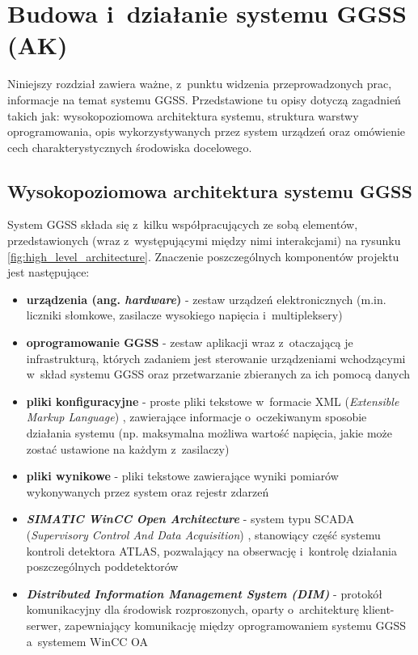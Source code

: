 \chapter{Budowa i~działanie systemu GGSS (AK)}
\label{cha:ggss}

\graphicspath{{3_ggss_introduction/static/}}

Niniejszy rozdział zawiera ważne, z~punktu widzenia przeprowadzonych prac, informacje na temat systemu GGSS. Przedstawione tu opisy dotyczą zagadnień takich jak: wysokopoziomowa architektura systemu, struktura warstwy oprogramowania, opis wykorzystywanych przez system urządzeń oraz omówienie cech charakterystycznych środowiska docelowego. 

\section{Wysokopoziomowa architektura systemu GGSS}
System GGSS składa się z~kilku współpracujących ze sobą elementów, przedstawionych (wraz z~występującymi między nimi interakcjami) na rysunku \ref{fig:high_level_architecture}. Znaczenie poszczególnych komponentów projektu jest następujące:
\begin{itemize}
    \item \textbf{urządzenia (ang. \emph{hardware})} - zestaw urządzeń elektronicznych (m.in. liczniki słomkowe, zasilacze wysokiego napięcia i~multipleksery)
    \item \textbf{oprogramowanie GGSS} - zestaw aplikacji wraz z~otaczającą je infrastrukturą, których zadaniem jest sterowanie urządzeniami wchodzącymi w~skład systemu GGSS oraz przetwarzanie zbieranych za ich pomocą danych
    \item \textbf{pliki konfiguracyjne} - proste pliki tekstowe w~formacie XML (\emph{Extensible Markup Language}) \cite{XML_wikipedia}, zawierające informacje o~oczekiwanym sposobie działania systemu (np. maksymalna możliwa wartość napięcia, jakie może zostać ustawione na każdym z~zasilaczy)
    \item \textbf{pliki wynikowe} - pliki tekstowe zawierające wyniki pomiarów wykonywanych przez system oraz rejestr zdarzeń 
    \item \emph{\textbf{SIMATIC WinCC Open Architecture}} \cite{winccoa} - system typu SCADA (\emph{Supervisory Control And Data Acquisition}) \cite{SCADA_wikipedia}, stanowiący część systemu kontroli detektora ATLAS, pozwalający na obserwację i~kontrolę działania poszczególnych poddetektorów
    \item \emph{\textbf{Distributed Information Management System (DIM)}} \cite{DIMwebsite} - protokół komunikacyjny dla środowisk rozproszonych, oparty o~architekturę klient-serwer, zapewniający komunikację między oprogramowaniem systemu GGSS a~systemem WinCC OA
\end{itemize}

